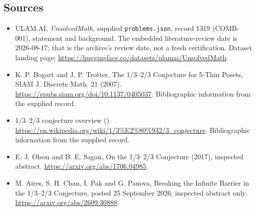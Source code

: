 \documentclass[11pt,a4paper]{article}
\begin{document}
\subsection{Sources}

{\small

\begin{itemize}

\item[\hypertarget{source:1319:1}{S1}] ULAM.AI, \emph{UnsolvedMath}, supplied \texttt{problems.json}, record 1319 (COMB-001), statement and background. The embedded literature-review date is 2026-08-17; that is the archive’s review date, not a fresh certification. Dataset landing page: \url{https://huggingface.co/datasets/ulamai/UnsolvedMath}.

\item[\hypertarget{source:1319:2}{S2}] K. P. Bogart and J. P. Trotter, The 1/3--2/3 Conjecture for 5-Thin Posets, SIAM J. Discrete Math. 21 (2007). \url{https://epubs.siam.org/doi/10.1137/0405037}. Bibliographic information from the supplied record.

\item[\hypertarget{source:1319:3}{S3}] 1/3--2/3 conjecture overview (). \url{https://en.wikipedia.org/wiki/1/3%E2%80%932/3_conjecture}. Bibliographic information from the supplied record.

\item[R1] E. J. Olson and B. E. Sagan, On the 1/3--2/3 Conjecture (2017), inspected abstract.
\url{https://arxiv.org/abs/1706.04985}.
\item[R2] M. Aires, S. H. Chan, I. Pak and G. Panova, Breaking the Infinite Barrier in the 1/3--2/3 Conjecture, posted 25 September 2026; inspected abstract only.
\url{https://arxiv.org/abs/2609.30888}.
\end{itemize}

}

\label{end:1319}
\end{document}

